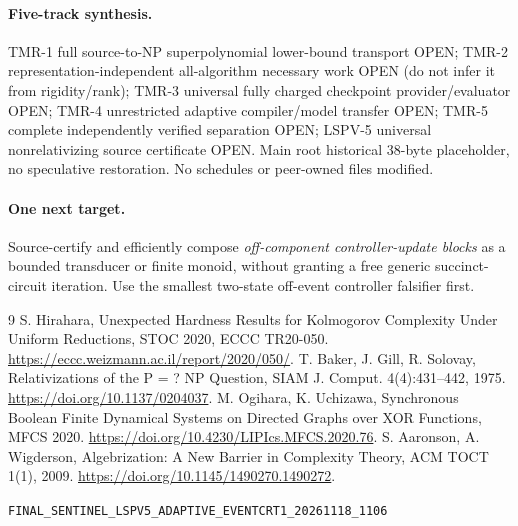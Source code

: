 \documentclass[11pt]{article}
\begin{document}
\paragraph{Five-track synthesis.} TMR-1 full source-to-NP superpolynomial lower-bound transport OPEN; TMR-2 representation-independent all-algorithm necessary work OPEN (do not infer it from rigidity/rank); TMR-3 universal fully charged checkpoint provider/evaluator OPEN; TMR-4 unrestricted adaptive compiler/model transfer OPEN; TMR-5 complete independently verified separation OPEN; LSPV-5 universal nonrelativizing source certificate OPEN. Main root historical 38-byte placeholder, no speculative restoration. No schedules or peer-owned files modified.
\paragraph{One next target.} Source-certify and efficiently compose \emph{off-component controller-update blocks} as a bounded transducer or finite monoid, without granting a free generic succinct-circuit iteration. Use the smallest two-state off-event controller falsifier first.
\begin{thebibliography}{9}
 S. Hirahara, Unexpected Hardness Results for Kolmogorov Complexity Under Uniform Reductions, STOC 2020, ECCC TR20-050. \url{https://eccc.weizmann.ac.il/report/2020/050/}.
 T. Baker, J. Gill, R. Solovay, Relativizations of the P = ? NP Question, SIAM J. Comput. 4(4):431--442, 1975. \url{https://doi.org/10.1137/0204037}.
 M. Ogihara, K. Uchizawa, Synchronous Boolean Finite Dynamical Systems on Directed Graphs over XOR Functions, MFCS 2020. \url{https://doi.org/10.4230/LIPIcs.MFCS.2020.76}.
 S. Aaronson, A. Wigderson, Algebrization: A New Barrier in Complexity Theory, ACM TOCT 1(1), 2009. \url{https://doi.org/10.1145/1490270.1490272}.
\end{thebibliography}
\noindent\texttt{FINAL\_SENTINEL\_LSPV5\_ADAPTIVE\_EVENTCRT1\_20261118\_1106}
\end{document}

